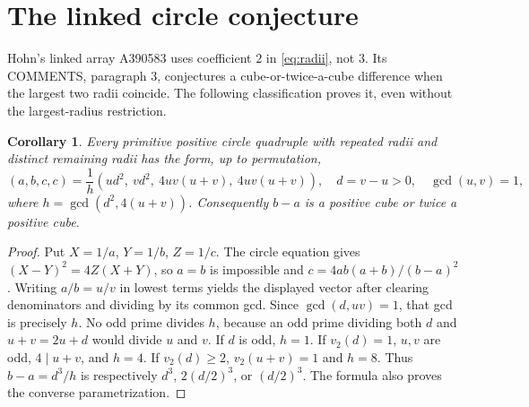 \documentclass[11pt]{article}
\newtheorem{corollary}[theorem]{Corollary}
\begin{document}
\section{The linked circle conjecture}
Hohn's linked array A390583 \cite{circles} uses coefficient $2$ in
\eqref{eq:radii}, not $3$. Its COMMENTS, paragraph 3, conjectures
a cube-or-twice-a-cube difference when the largest two radii coincide.
The following classification proves it, even without the largest-radius
restriction.
\begin{corollary}\label{cor:circle}
Every primitive positive circle quadruple with repeated radii and
distinct remaining radii has the form, up to permutation,
\[
 (a,b,c,c)=\frac1h
 (u d^2,\ v d^2,\ 4uv(u+v),\ 4uv(u+v)),
 \quad d=v-u>0,\quad \gcd(u,v)=1,
\]
where $h=\gcd(d^2,4(u+v))$. Consequently $b-a$ is a positive cube
or twice a positive cube.
\end{corollary}
\begin{proof}
Put $X=1/a$, $Y=1/b$, $Z=1/c$. The circle equation gives
$(X-Y)^2=4Z(X+Y)$, so $a=b$ is impossible and
$c=4ab(a+b)/(b-a)^2$. Writing $a/b=u/v$ in lowest terms yields
the displayed vector after clearing denominators and dividing by its
common gcd. Since $\gcd(d,uv)=1$, that gcd is precisely $h$.
No odd prime divides $h$, because an odd prime dividing both $d$ and
$u+v=2u+d$ would divide $u$ and $v$. If $d$ is odd, $h=1$.
If $v_2(d)=1$, $u,v$ are odd, $4\mid u+v$, and $h=4$.
If $v_2(d)\ge2$, $v_2(u+v)=1$ and $h=8$.
Thus $b-a=d^3/h$ is respectively $d^3$, $2(d/2)^3$, or
$(d/2)^3$. The formula also proves the converse parametrization.
\end{proof}
\end{document}
